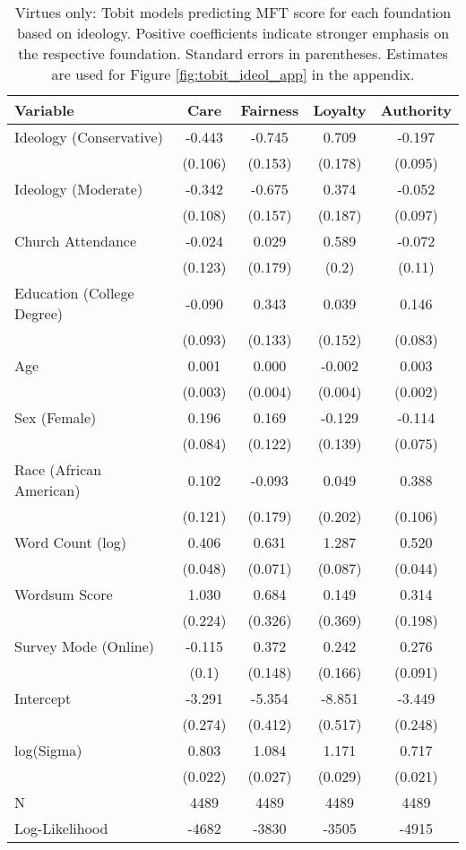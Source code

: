 \begin{table}[ht]
\centering
\caption{Virtues only: Tobit models predicting MFT score for each foundation based 
           on ideology. Positive coefficients indicate stronger emphasis on the respective 
           foundation. Standard errors in parentheses. Estimates are used for 
           Figure \ref{fig:tobit_ideol_app} in the appendix.} 
\label{tab:tobit_virtue}
\begingroup\footnotesize
\begin{tabular}{lcccc}
  \hline
Variable & Care & Fairness & Loyalty & Authority \\ 
  \hline
Ideology (Conservative) & -0.443 & -0.745 &  0.709 & -0.197 \\ 
   & (0.106) & (0.153) & (0.178) & (0.095) \\ 
  Ideology (Moderate) & -0.342 & -0.675 &  0.374 & -0.052 \\ 
   & (0.108) & (0.157) & (0.187) & (0.097) \\ 
  Church Attendance & -0.024 &  0.029 &  0.589 & -0.072 \\ 
   & (0.123) & (0.179) & (0.2) & (0.11) \\ 
  Education (College Degree) & -0.090 &  0.343 &  0.039 &  0.146 \\ 
   & (0.093) & (0.133) & (0.152) & (0.083) \\ 
  Age &  0.001 &  0.000 & -0.002 &  0.003 \\ 
   & (0.003) & (0.004) & (0.004) & (0.002) \\ 
  Sex (Female) &  0.196 &  0.169 & -0.129 & -0.114 \\ 
   & (0.084) & (0.122) & (0.139) & (0.075) \\ 
  Race (African American) &  0.102 & -0.093 &  0.049 &  0.388 \\ 
   & (0.121) & (0.179) & (0.202) & (0.106) \\ 
  Word Count (log) &  0.406 &  0.631 &  1.287 &  0.520 \\ 
   & (0.048) & (0.071) & (0.087) & (0.044) \\ 
  Wordsum Score &  1.030 &  0.684 &  0.149 &  0.314 \\ 
   & (0.224) & (0.326) & (0.369) & (0.198) \\ 
  Survey Mode (Online) & -0.115 &  0.372 &  0.242 &  0.276 \\ 
   & (0.1) & (0.148) & (0.166) & (0.091) \\ 
  Intercept & -3.291 & -5.354 & -8.851 & -3.449 \\ 
   & (0.274) & (0.412) & (0.517) & (0.248) \\ 
  log(Sigma) &  0.803 &  1.084 &  1.171 &  0.717 \\ 
   & (0.022) & (0.027) & (0.029) & (0.021) \\ 
   \hline
N & 4489 & 4489 & 4489 & 4489 \\ 
  Log-Likelihood & -4682 & -3830 & -3505 & -4915 \\ 
   \hline
\end{tabular}
\endgroup
\end{table}
